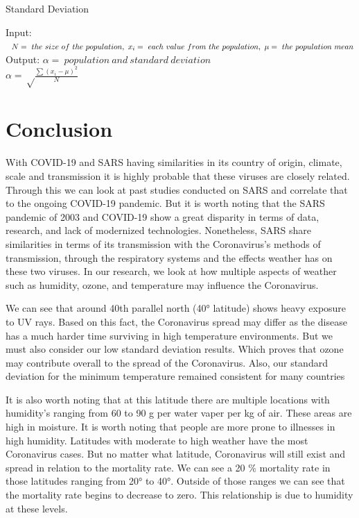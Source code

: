 \documentclass[10pt,journal,compsoc]{IEEEtran}
\begin{document}
{{%

{\SetAlgoNoLine
	\begin{algorithm}
		\caption{Standard Deviation}
		\label{Algo: Calculate Standard Deviation:BWLP}
		Input: $\ 
		\ N = \ the \ size \ of \ the \ population, \newline
		\ x_i = \ each \ value \ from \ the \ population, \newline
		\ \mu = \ the \ population \ mean
		$\\
		Output: $  \alpha = \ population \ and \ standard \ deviation $\\
			
$ 			 	 \alpha = \sqrt\frac{\sum (x_i - \mu)^2}{N} $
	\end{algorithm}


\section{Conclusion}
\label{sec: conclusion}

	With COVID-19 and SARS having similarities in its country of origin, climate, scale and transmission it is highly probable that these viruses are closely related. Through this we can look at past studies conducted on SARS and correlate that to the ongoing COVID-19 pandemic. But it is worth noting that the SARS pandemic of 2003 and COVID-19 show a great disparity in terms of data, research, and lack of modernized technologies. Nonetheless, SARS share similarities in terms of its transmission with the Coronavirus’s methods of transmission, through the respiratory systems and the effects weather has on these two viruses. In our research, we look at how multiple aspects of weather such as humidity, ozone, and temperature may influence the Coronavirus.

	We can see that around 40th parallel north (40° latitude) shows heavy exposure to UV rays. Based on this fact, the Coronavirus spread may differ as the disease has a much harder time surviving in high temperature environments. But we must also consider our low standard deviation results. Which proves that ozone may contribute overall to the spread of the Coronavirus. Also, our standard deviation for the minimum temperature remained consistent for many countries

	It is also worth noting that at this latitude there are multiple locations with humidity’s ranging from 60 to 90 g per water vaper per kg of air. These areas are high in moisture. It is worth noting that people are more prone to illnesses in high humidity. Latitudes with moderate to high weather have the most Coronavirus cases. But no matter what latitude, Coronavirus will still exist and spread in relation to the mortality rate. We can see a 20 \% mortality rate in those latitudes ranging from 20° to 40°. Outside of those ranges we can see that the mortality rate begins to decrease to zero. This relationship is due to humidity at these levels.

}}}
\end{document}
